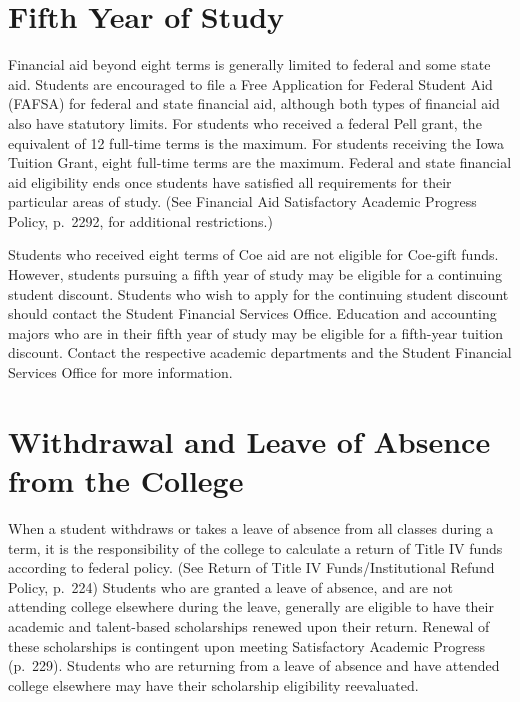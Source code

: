 \documentclass[
  letterpaper,
]{scrbook}
\begin{document}
\section{\texorpdfstring{\textbf{Fifth Year of
Study}}{Fifth Year of Study}}\label{fifth-year-of-study}

Financial aid beyond eight terms is generally limited to federal and
some state aid. Students are encouraged to file a Free Application for
Federal Student Aid (FAFSA) for federal and state financial aid,
although both types of financial aid also have statutory limits. For
students who received a federal Pell grant, the equivalent of 12
full-time terms is the maximum. For students receiving the Iowa Tuition
Grant, eight full-time terms are the maximum. Federal and state
financial aid eligibility ends once students have satisfied all
requirements for their particular areas of study. (See Financial Aid
Satisfactory Academic Progress Policy, p.~2292, for additional
restrictions.)

Students who received eight terms of Coe aid are not eligible for
Coe-gift funds. However, students pursuing a fifth year of study may be
eligible for a continuing student discount. Students who wish to apply
for the continuing student discount should contact the Student Financial
Services Office. Education and accounting majors who are in their fifth
year of study may be eligible for a fifth-year tuition discount. Contact
the respective academic departments and the Student Financial Services
Office for more information.

\section{\texorpdfstring{\textbf{Withdrawal and Leave of Absence from
the
College}}{Withdrawal and Leave of Absence from the College}}\label{withdrawal-and-leave-of-absence-from-the-college}

When a student withdraws or takes a leave of absence from all classes
during a term, it is the responsibility of the college to calculate a
return of Title IV funds according to federal policy. (See Return of
Title IV Funds/Institutional Refund Policy, p.~224) Students who are
granted a leave of absence, and are not attending college elsewhere
during the leave, generally are eligible to have their academic and
talent-based scholarships renewed upon their return. Renewal of these
scholarships is contingent upon meeting Satisfactory Academic Progress
(p.~229). Students who are returning from a leave of absence and have
attended college elsewhere may have their scholarship eligibility
reevaluated.
\end{document}

